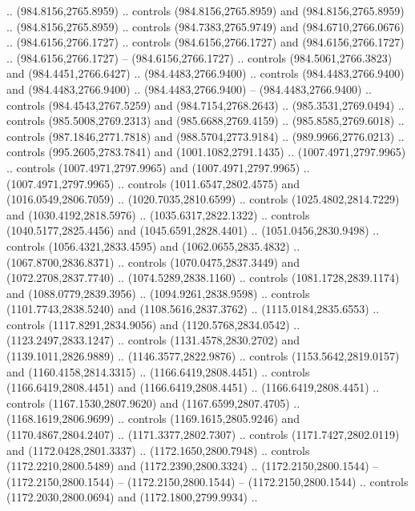 \begin{scope}[shift={(296.85925,-6.26562)}]
\begin{scope}[shift={(-138.30846,-2572.6617)}]
\begin{scope}
\begin{scope}[cm={{0.8861,0.0,0.0,0.8861,(122.84989,319.1771)}}]
          .. (984.8156,2765.8959) .. controls (984.8156,2765.8959) and
          (984.8156,2765.8959) .. (984.8156,2765.8959) .. controls (984.7383,2765.9749)
          and (984.6710,2766.0676) .. (984.6156,2766.1727) .. controls
          (984.6156,2766.1727) and (984.6156,2766.1727) .. (984.6156,2766.1727) --
          (984.6156,2766.1727) .. controls (984.5061,2766.3823) and (984.4451,2766.6427)
          .. (984.4483,2766.9400) .. controls (984.4483,2766.9400) and
          (984.4483,2766.9400) .. (984.4483,2766.9400) -- (984.4483,2766.9400) ..
          controls (984.4543,2767.5259) and (984.7154,2768.2643) .. (985.3531,2769.0494)
          .. controls (985.5008,2769.2313) and (985.6688,2769.4159) ..
          (985.8585,2769.6018) .. controls (987.1846,2771.7818) and (988.5704,2773.9184)
          .. (989.9966,2776.0213) .. controls (995.2605,2783.7841) and
          (1001.1082,2791.1435) .. (1007.4971,2797.9965) .. controls
          (1007.4971,2797.9965) and (1007.4971,2797.9965) .. (1007.4971,2797.9965) ..
          controls (1011.6547,2802.4575) and (1016.0549,2806.7059) ..
          (1020.7035,2810.6599) .. controls (1025.4802,2814.7229) and
          (1030.4192,2818.5976) .. (1035.6317,2822.1322) .. controls
          (1040.5177,2825.4456) and (1045.6591,2828.4401) .. (1051.0456,2830.9498) ..
          controls (1056.4321,2833.4595) and (1062.0655,2835.4832) ..
          (1067.8700,2836.8371) .. controls (1070.0475,2837.3449) and
          (1072.2708,2837.7740) .. (1074.5289,2838.1160) .. controls
          (1081.1728,2839.1174) and (1088.0779,2839.3956) .. (1094.9261,2838.9598) ..
          controls (1101.7743,2838.5240) and (1108.5616,2837.3762) ..
          (1115.0184,2835.6553) .. controls (1117.8291,2834.9056) and
          (1120.5768,2834.0542) .. (1123.2497,2833.1247) .. controls
          (1131.4578,2830.2702) and (1139.1011,2826.9889) .. (1146.3577,2822.9876) ..
          controls (1153.5642,2819.0157) and (1160.4158,2814.3315) ..
          (1166.6419,2808.4451) .. controls (1166.6419,2808.4451) and
          (1166.6419,2808.4451) .. (1166.6419,2808.4451) .. controls
          (1167.1530,2807.9620) and (1167.6599,2807.4705) .. (1168.1619,2806.9699) ..
          controls (1169.1615,2805.9246) and (1170.4867,2804.2407) ..
          (1171.3377,2802.7307) .. controls (1171.7427,2802.0119) and
          (1172.0428,2801.3337) .. (1172.1650,2800.7948) .. controls
          (1172.2210,2800.5489) and (1172.2390,2800.3324) .. (1172.2150,2800.1544) --
          (1172.2150,2800.1544) -- (1172.2150,2800.1544) -- (1172.2150,2800.1544) ..
          controls (1172.2030,2800.0694) and (1172.1800,2799.9934) ..

\end{scope}
\end{scope}
\end{scope}
\end{scope}
